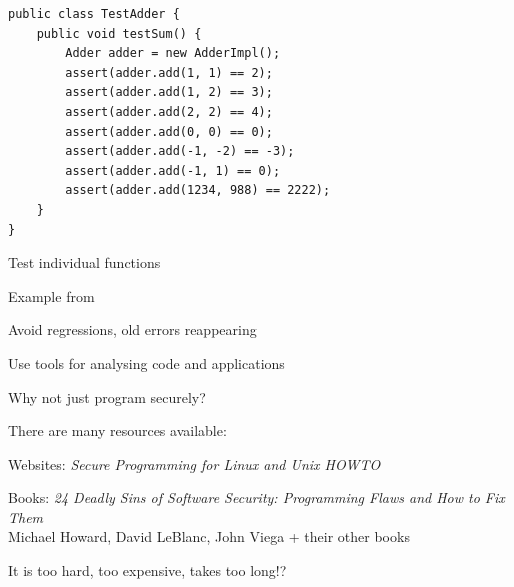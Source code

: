 \documentclass[Screen16to9,17pt]{foils}
\begin{document}
\begin{verbatim}
public class TestAdder {
    public void testSum() {
        Adder adder = new AdderImpl();
        assert(adder.add(1, 1) == 2);
        assert(adder.add(1, 2) == 3);
        assert(adder.add(2, 2) == 4);
        assert(adder.add(0, 0) == 0);
        assert(adder.add(-1, -2) == -3);
        assert(adder.add(-1, 1) == 0);
        assert(adder.add(1234, 988) == 2222);
    }
}
\end{verbatim}

\begin{list1}
\item Test individual functions
\item Example from 
\item Avoid regressions, old errors reappearing
\end{list1}



\centerline{Use tools for analysing code and applications}


\begin{list1}
\item Why not just program securely?
\item There are many resources available:
\item Websites: \emph{Secure Programming for Linux and Unix HOWTO}\\
\item Books: \emph{24 Deadly Sins of Software Security: Programming Flaws and How to Fix Them}\\
Michael Howard, David LeBlanc, John Viega + their other books
\end{list1}

\vskip 2cm
\centerline{\Large It is too hard, too expensive, takes too long!?}


\end{document}
